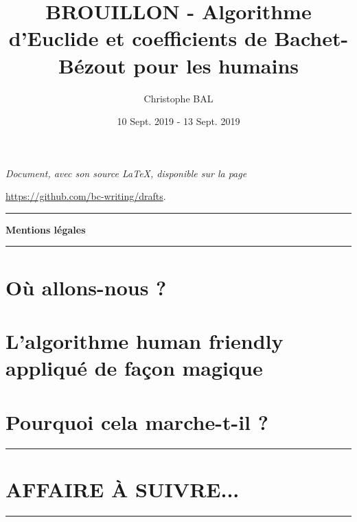 \documentclass[12pt]{amsart}
\newcommand\myquote[1]{\emph{\og #1 \fg}}
\begin{document}
\title{BROUILLON - Algorithme d'Euclide et coefficients de Bachet-Bézout pour les humains}
\author{Christophe BAL}
\date{10 Sept. 2019 - 13  Sept. 2019}

\maketitle

\begin{center}
    \itshape
    Document, avec son source \LaTeX, disponible sur la page
    
    \url{https://github.com/bc-writing/drafts}.
\end{center}


\bigskip


\begin{center}
    \hrule\vspace{.3em}
    {
        \fontsize{1.35em}{1em}\selectfont
        \textbf{Mentions \og légales \fg}
    }
            
    \vspace{0.45em}
    \doclicenseThis
    \hrule
\end{center}


\setcounter{tocdepth}{2}
\tableofcontents




\section{Où allons-nous ?}






\section{L'algorithme \og human friendly \fg{} appliqué de façon magique}






\section{Pourquoi cela marche-t-il ?}







%

\bigskip

\hrule

\section{AFFAIRE À SUIVRE...}

\bigskip

\hrule
\end{document}
